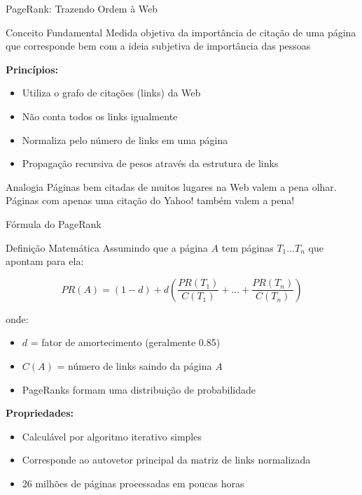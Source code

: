 \documentclass[aspectratio=169]{beamer}
\begin{document}
\begin{frame}{PageRank: Trazendo Ordem à Web}
\begin{block}{Conceito Fundamental}
Medida objetiva da importância de citação de uma página que corresponde bem com a ideia subjetiva de importância das pessoas
\end{block}

\vspace{0.3cm}
\textbf{Princípios:}
\begin{itemize}
\item Utiliza o grafo de citações (links) da Web
\item Não conta todos os links igualmente
\item Normaliza pelo número de links em uma página
\item Propagação recursiva de pesos através da estrutura de links
\end{itemize}

\vspace{0.3cm}
\begin{exampleblock}{Analogia}
Páginas bem citadas de muitos lugares na Web valem a pena olhar. Páginas com apenas uma citação do Yahoo! também valem a pena!
\end{exampleblock}
\end{frame}

\begin{frame}{Fórmula do PageRank}
\begin{block}{Definição Matemática}
Assumindo que a página $A$ tem páginas $T_1...T_n$ que apontam para ela:

$$PR(A) = (1-d) + d\left(\frac{PR(T_1)}{C(T_1)} + ... + \frac{PR(T_n)}{C(T_n)}\right)$$

onde:
\begin{itemize}
\item $d$ = fator de amortecimento (geralmente 0.85)
\item $C(A)$ = número de links saindo da página $A$
\item PageRanks formam uma distribuição de probabilidade
\end{itemize}
\end{block}

\vspace{0.3cm}
\textbf{Propriedades:}
\begin{itemize}
\item Calculável por algoritmo iterativo simples
\item Corresponde ao autovetor principal da matriz de links normalizada
\item 26 milhões de páginas processadas em poucas horas
\end{itemize}
\end{frame}
\end{document}
